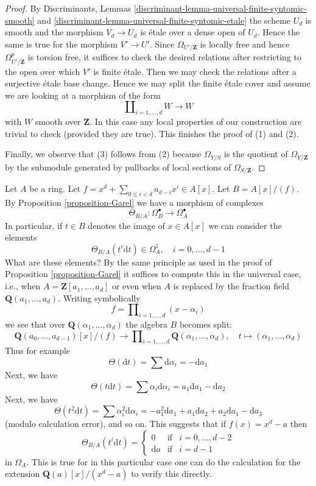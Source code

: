 \begin{proof}
\medskip\noindent
By Discriminants, Lemmas
\ref{discriminant-lemma-universal-finite-syntomic-smooth} and
\ref{discriminant-lemma-universal-finite-syntomic-etale}
the scheme $U_d$ is smooth and the morphism $V_d \to U_d$
is \'etale over a dense open of $U_d$.
Hence the same is true for the morphism
$V' \to U'$. Since $\Omega_{U'/\mathbf{Z}}$ is locally free and hence
$\Omega^p_{U'/\mathbf{Z}}$ is torsion
free, it suffices to check the desired relations
after restricting to the open over which $V'$ is finite \'etale.
Then we may check the relations after a surjective \'etale
base change. Hence we may split the finite \'etale cover
and assume we are looking at a morphism of the form
$$
\coprod\nolimits_{i = 1, \ldots, d} W \longrightarrow W
$$
with $W$ smooth over $\mathbf{Z}$.
In this case any local properties of our construction are trivial to check
(provided they are true). This finishes the proof of (1) and (2).

\medskip\noindent
Finally, we observe that (3) follows from (2) because $\Omega_{Y/S}$
is the quotient of $\Omega_{Y/\mathbf{Z}}$ by the submodule
generated by pullbacks of local sections of $\Omega_{S/\mathbf{Z}}$.
\end{proof}

\begin{example}
\label{example-Garel}
Let $A$ be a ring. Let $f = x^d + \sum_{0 \leq i < d} a_{d - i} x^i \in A[x]$.
Let $B = A[x]/(f)$. By Proposition \ref{proposition-Garel}
we have a morphism of complexes
$$
\Theta_{B/A} : \Omega^\bullet_B \longrightarrow \Omega^\bullet_A
$$
In particular, if $t \in B$ denotes the image of $x \in A[x]$
we can consider the elements
$$
\Theta_{B/A}(t^i\text{d}t) \in \Omega^1_A,\quad i = 0, \ldots, d - 1
$$
What are these elements? By the same principle as used in the proof of
Proposition \ref{proposition-Garel} it suffices to compute this
in the universal case, i.e., when $A = \mathbf{Z}[a_1, \ldots, a_d]$
or even when $A$ is replaced by the fraction field
$\mathbf{Q}(a_1, \ldots, a_d)$. Writing symbolically
$$
f = \prod\nolimits_{i = 1, \ldots, d} (x - \alpha_i)
$$
we see that over $\mathbf{Q}(\alpha_1, \ldots, \alpha_d)$
the algebra $B$ becomes split:
$$
\mathbf{Q}(a_0, \ldots, a_{d - 1})[x]/(f) 
\longrightarrow
\prod\nolimits_{i = 1, \ldots, d} \mathbf{Q}(\alpha_1, \ldots, \alpha_d),
\quad
t \longmapsto (\alpha_1, \ldots, \alpha_d)
$$
Thus for example
$$
\Theta(\text{d}t) = \sum \text{d} \alpha_i = - \text{d}a_1
$$
Next, we have
$$
\Theta(t\text{d}t) = \sum \alpha_i \text{d}\alpha_i =
a_1 \text{d} a_1 - \text{d}a_2
$$
Next, we have
$$
\Theta(t^2\text{d}t) = \sum \alpha_i^2 \text{d}\alpha_i =
- a_1^2 \text{d} a_1 + a_1 \text{d}a_2 + a_2 \text{d}a_1 - \text{d}a_3
$$
(modulo calculation error), and so on. This suggests that
if $f(x) = x^d - a$ then
$$
\Theta_{B/A}(t^i\text{d}t) =
\left\{
\begin{matrix}
0 & \text{if} & i = 0, \ldots, d - 2 \\
\text{d}a & \text{if} & i = d - 1
\end{matrix}
\right.
$$
in $\Omega_A$. This is true for in this particular case one can do
the calculation for the extension $\mathbf{Q}(a)[x]/(x^d - a)$
to verify this directly.
\end{example}

